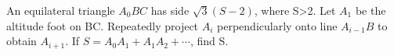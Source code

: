 An equilateral triangle $A_0BC$ has side $\sqrt3(S-2)$, where S>2. Let $A_1$ be the altitude foot on BC. Repeatedly project $A_i$ perpendicularly onto line $A_{i-1}B$ to obtain $A_{i+1}$. If $S=A_0A_1+A_1A_2+\cdots$, find S.
